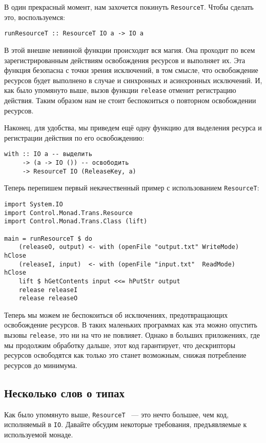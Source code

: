 В один прекрасный момент, нам захочется покинуть \lstinline'ResourceT'. Чтобы сделать это,
воспользуемся:
\begin{lstlisting}
runResourceT :: ResourceT IO a -> IO a
\end{lstlisting}
В этой внешне невинной функции происходит вся магия. Она проходит по всем зарегистрированным действиям освобождения ресурсов и выполняет их.
Эта функция безопасна с точки зрения исключений, в
том смысле, что освобождение ресурсов будет выполнено в случае и синхронных и
асинхронных исключений. И, как было упомянуто выше, вызов функции \lstinline'release'
отменит
регистрацию действия. Таким образом нам не стоит беспокоиться о повторном освобождении
ресурсов.

Наконец, для удобства, мы приведем ещё одну функцию для выделения ресурса и регистрации
действия по его освобождению:
\begin{lstlisting}
with :: IO a -- выделить
     -> (a -> IO ()) -- освободить
     -> ResourceT IO (ReleaseKey, a)
\end{lstlisting}

Теперь перепишем первый некачественный пример с использованием \lstinline'ResourceT':
\begin{lstlisting}
import System.IO
import Control.Monad.Trans.Resource
import Control.Monad.Trans.Class (lift)

main = runResourceT $ do
    (releaseO, output) <- with (openFile "output.txt" WriteMode) hClose
    (releaseI, input)  <- with (openFile "input.txt"  ReadMode)  hClose
    lift $ hGetContents input <<= hPutStr output
    release releaseI
    release releaseO
\end{lstlisting}

Теперь мы можем не беспокоиться об исключениях, предотвращающих освобождение ресурсов.
В таких маленьких программах как эта можно опустить вызовы \lstinline!release!, это ни на что
не повлияет. Однако в больших приложениях, где мы продолжим обработку дальше, этот код
гарантирует, что дескрипторы ресурсов освободятся как только это станет возможным, снижая
потребление ресурсов до минимума.

\subsection{Несколько слов о типах}

Как было упомянуто выше, \lstinline'ResourceT' ~--- это нечто большее, чем код, исполняемый в \lstinline{IO}.
Давайте обсудим некоторые требования, предъявляемые к используемой монаде.

